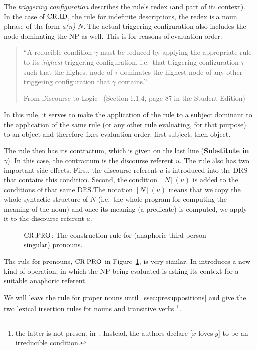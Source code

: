 The \emph{triggering configuration} describes the rule's redex (and part of
its context). In the case of $\mathrm{CR.ID}$, the rule for indefinite descriptions,
the redex is a noun phrase of the form \emph{a(n) $N$}. The actual
triggering configuration also includes the node dominating the NP as
well. This is for reasons of evaluation order:

\begin{quote}
``A reducible condition $\gamma$ must be reduced by applying the appropriate
rule to its \emph{highest} triggering configuration, i.e.\ that triggering
configuration $\tau$ such that the highest node of $\tau$ dominates the
highest node of any other triggering configuration that $\gamma$ contains.''
\begin{flushright}
  From Discourse to Logic~\cite{kamp1993discourse} (Section 1.1.4, page 87
  in the Student Edition)
\end{flushright}
\end{quote}

In this rule, it serves to make the application of the rule to a subject
dominant to the application of the same rule (or any other rule evaluating,
for that purpose) to an object and therefore fixes evaluation order: first
subject, then object.

The rule then has its contractum, which is given on the last line
(\textbf{Substitute in $\overline{\gamma}$}). In this case, the contractum
is the discourse referent $u$. The rule also has two important side
effects. First, the discourse referent $u$ is introduced into the DRS that
contains this condition. Second, the condition $[N](u)$ is added to the
conditions of that same DRS.\@ The notation $[N](u)$ means that we copy the
whole syntactic structure of $N$ (i.e.\ the whole program for computing the
meaning of the noun) and once its meaning (a predicate) is computed, we
apply it to the discourse referent $u$.

\begin{figure}
\centering
\crprobox
\caption{\label{fig:crpro} $\mathrm{CR.PRO}$: The construction rule for (anaphoric
  third-person singular) pronouns.}
\end{figure}

The rule for pronouns, $\mathrm{CR.PRO}$ in Figure~\ref{fig:crpro}, is very
similar. In introduces a new kind of operation, in which the NP being
evaluated is asking its context for a suitable anaphoric referent.

We will leave the rule for proper nouns until~\ref{ssec:presuppositions}
and give the two lexical insertion rules for nouns and transitive verbs
\footnote{the latter is not present in~\cite{kamp1993discourse}. Instead,
  the authors declare [$x$ loves $y$] to be an irreducible condition.}.

